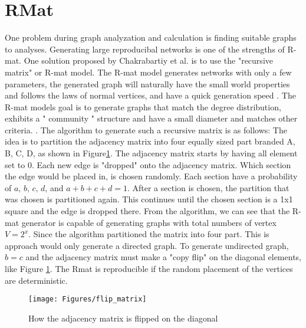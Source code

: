 \section{RMat} \label{rmat}
One problem during graph analyzation and calculation is finding suitable graphs to analyses. Generating large reproducibal networks is one of the strengths of R-mat. One solution proposed by Chakrabartiy et al. is to use the "recursive matrix" or R-mat model. The R-mat model generates networks with only a few parameters, the generated graph will naturally have the small world properties and follows the laws of normal vertices, and have a quick generation speed \cite{Rmat2004}. The R-mat models goal is to generate graphs that match the degree distribution, exhibits a " community " structure and have a small diameter and matches other criteria. \cite{Rmat2004}. The algorithm to generate such a recursive matrix is as follows: The idea is to partition the adjacency matrix into four equally sized part branded A, B, C, D, as shown in Figure\ref{fig:flipDiagonal}. The adjacency matrix starts by having all element set to 0. Each new edge is "dropped" onto the adjacency matrix. Which section the edge would be placed in, is chosen randomly. Each section have a probability of $\textit{a, b, c, d}$, and $a + b + c + d = 1$. After a section is chosen, the partition that was chosen is partitioned again. This continues until the chosen section is a 1x1 square and the edge is dropped there. From the algorithm, we can see that the R-mat generator is capable of generating graphs with total numbers of vertex $ \textit{V} = 2^x$. Since the algorithm partitioned the matrix into four part. This is approach would only generate a directed graph. To generate undirected graph, $b = c$ and the adjacency matrix must make a "copy flip" on the diagonal elements, like Figure \ref{fig:flipDiagonal}. The Rmat is reproducible if the random placement of the vertices are deterministic.

\begin{figure}
\texttt{[image: Figures/flip\_matrix]}
\caption{How the adjacency matrix is flipped on the diagonal}
\label{fig:flipDiagonal}
\end{figure}